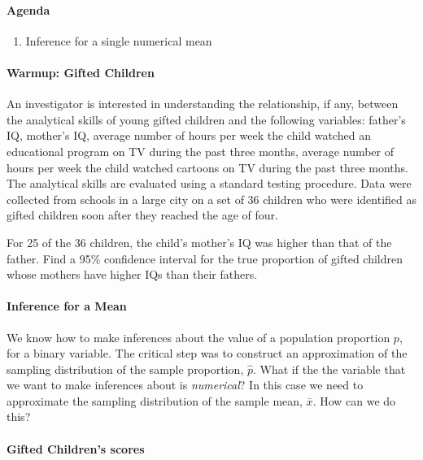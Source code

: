 \documentclass[10pt]{article}\usepackage[]{graphicx}\usepackage[]{color}
\begin{document}
\paragraph{Agenda}
\begin{enumerate}
  \itemsep0em
  \item Inference for a single numerical mean
\end{enumerate}

\paragraph{Warmup: Gifted Children}

An investigator is interested in understanding the relationship, if any, between the analytical skills of young gifted children and the following variables: father's IQ, mother's IQ, average number of hours per week the child watched an educational program on TV during the past three months, average number of hours per week the child watched cartoons on TV during the past three months. The analytical skills are evaluated using a standard testing procedure. Data were collected from schools in a large city on a set of 36 children who were identified as gifted children soon after they reached the age of four.

For 25 of the 36 children, the child's mother's IQ was higher than that of the father. Find a 95\% confidence interval for the true proportion of gifted children whose mothers have higher IQs than their fathers. 


\vspace{1.2in}

\paragraph{Inference for a Mean}

We know how to make inferences about the value of a population proportion $p$, for a binary variable. The critical step was to construct an approximation of the sampling distribution of the sample proportion, $\hat{p}$. What if the the variable that we want to make inferences about is \emph{numerical}? In this case we need to approximate the sampling distribution of the sample mean, $\bar{x}$. How can we do this?

\vspace{1in}

\paragraph{Gifted Children's scores}
\end{document}
